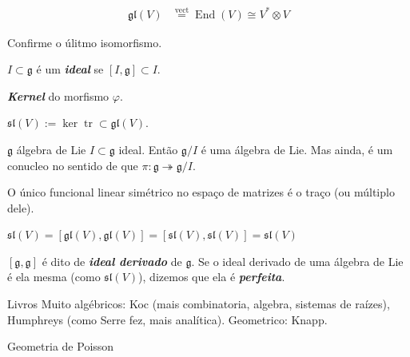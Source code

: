 \begin{align*}
\mathfrak{gl}(V)&\overset{\operatorname{vect}}{=}\operatorname{End}(V)\cong V^* \otimes V
\end{align*}
\begin{exercise}\leavevmode
Confirme o úlitmo isomorfismo.
\end{exercise}
\begin{defn}\leavevmode
	\(I \subset \mathfrak{g}\) é um \textit{\textbf{ideal}} se \([I,\mathfrak{g}] \subset I\).
\end{defn}

\begin{defn}\leavevmode
\textit{\textbf{Kernel}} do morfismo \(\varphi\).
\end{defn}
\begin{defn}\leavevmode
\(\mathfrak{sl}(V):=\ker \operatorname{tr} \subset \mathfrak{gl}(V)\).
\end{defn}
\begin{lemma}\leavevmode
\(\mathfrak{g}\) álgebra de Lie \(I \subset \mathfrak{g}\) ideal. Então \(\mathfrak{g}/I\) é uma álgebra de Lie. Mas ainda, é um conucleo no sentido de que \(\pi:\mathfrak{g} \twoheadrightarrow \mathfrak{g}/I\).
\end{lemma}
\begin{prop}\leavevmode
O único funcional  linear simétrico no espaço de matrizes é o traço (ou múltiplo dele).
\end{prop}
\begin{coro}\leavevmode
	\(\mathfrak{sl}(V)=[\mathfrak{gl}(V),\mathfrak{gl}(V)]=[\mathfrak{sl}(V),\mathfrak{sl}(V)]=\mathfrak{sl}(V)\)
\end{coro}
\begin{defn}\leavevmode
	\([\mathfrak{g},\mathfrak{g}]\) é dito de \textit{\textbf{ideal derivado}} de  \(\mathfrak{g}\). Se o ideal derivado de uma álgebra de Lie é ela mesma (como \(\mathfrak{sl}(V)\)), dizemos que ela é \textit{\textbf{perfeita}}.
\end{defn}
\begin{thing7}{Livros}\leavevmode
Muito algébricos: Koc (mais combinatoria, algebra, sistemas de raízes), Humphreys (como Serre fez, mais analítica). Geometrico: Knapp.
\end{thing7}

\clearpage{}
{\Huge Geometria de Poisson}

